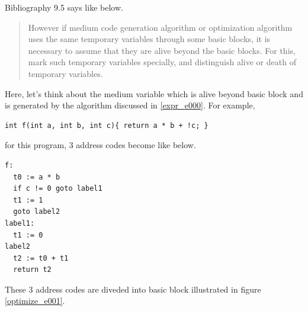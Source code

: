 \label{optimize_e004}
Bibliography \cite{doragon} 9.5 says like below.
\begin{quote}
However if medium code generation algorithm or optimization algorithm
uses the same temporary variables through some basic blocks,
it is necessary to assume that they are alive beyond the basic blocks.
For this, mark such temporary variables specially, and distinguish
alive or death of temporary variables.
\end{quote}
Here, let's think about the medium variable which is alive beyond
basic block and is generated by the algorithm discussed in \ref{expr_e000}.
For example,
\begin{verbatim}
int f(int a, int b, int c){ return a * b + !c; }
\end{verbatim}
for this program, 3 address codes become like below.
\begin{verbatim}
f:
  t0 := a * b
  if c != 0 goto label1
  t1 := 1
  goto label2
label1:
  t1 := 0
label2
  t2 := t0 + t1
  return t2
\end{verbatim}
These 3 address codes are diveded into basic block illustrated in
figure \ref{optimize_e001}.
